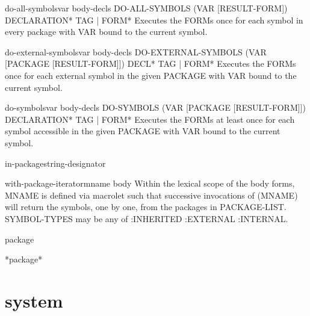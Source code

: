\documentclass[10pt,english]{book}
\begin{document}
\begin{macro}{do-all-symbols}{var \body body-decls}
  DO-ALL-SYMBOLS (VAR [RESULT-FORM]) {DECLARATION}* {TAG | FORM}*
   Executes the FORMs once for each symbol in every package with VAR bound
   to the current symbol.
\end{macro}

\begin{macro}{do-external-symbols}{var \body body-decls}
  DO-EXTERNAL-SYMBOLS (VAR [PACKAGE [RESULT-FORM]]) {DECL}* {TAG | FORM}*
   Executes the FORMs once for each external symbol in the given PACKAGE with
   VAR bound to the current symbol.
\end{macro}

\begin{macro}{do-symbols}{var \body body-decls}
  DO-SYMBOLS (VAR [PACKAGE [RESULT-FORM]]) {DECLARATION}* {TAG | FORM}*
   Executes the FORMs at least once for each symbol accessible in the given
   PACKAGE with VAR bound to the current symbol.
\end{macro}

\begin{macro}{in-package}{string-designator}
  
\end{macro}

\begin{macro}{with-package-iterator}{mname \body body}
  Within the lexical scope of the body forms, MNAME is defined via macrolet
such that successive invocations of (MNAME) will return the symbols, one by
one, from the packages in PACKAGE-LIST. SYMBOL-TYPES may be any
of :INHERITED :EXTERNAL :INTERNAL.
\end{macro}

\begin{class}{package}{}
  
\end{class}

\begin{variable}{*package*}{}
  
\end{variable}

\section{system}
\end{document}
